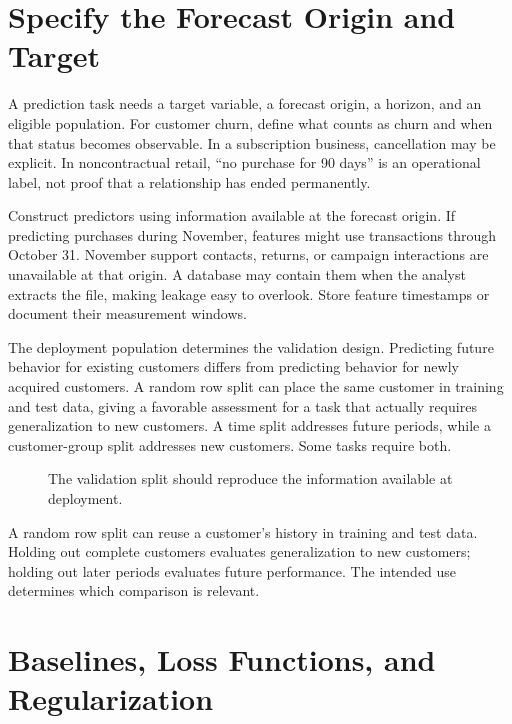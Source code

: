 \hypertarget{M07-specify-the-forecast-origin-and-target}{%
\section{Specify the Forecast Origin and
Target}\label{M07-specify-the-forecast-origin-and-target}}

\noindent A prediction task needs a target variable, a forecast origin, a horizon,
and an eligible population. For customer churn, define what counts as
churn and when that status becomes observable. In a subscription
business, cancellation may be explicit. In noncontractual retail, ``no
purchase for 90 days'' is an operational label, not proof that a
relationship has ended permanently.

Construct predictors using information available at the forecast origin.
If predicting purchases during November, features might use transactions
through October 31. November support contacts, returns, or campaign
interactions are unavailable at that origin. A database may contain them
when the analyst extracts the file, making leakage easy to overlook.
Store feature timestamps or document their measurement windows.

The deployment population determines the validation design. Predicting
future behavior for existing customers differs from predicting behavior
for newly acquired customers. A random row split can place the same
customer in training and test data, giving a favorable assessment for a
task that actually requires generalization to new customers. A time
split addresses future periods, while a customer-group split addresses
new customers. Some tasks require both.

\begin{figure}[htbp]
\centering

\caption{The validation split should reproduce the information available at deployment.}\label{fig:M07_splits}
\end{figure}

A random row split can reuse a customer's history in training and test
data. Holding out complete customers evaluates generalization to new
customers; holding out later periods evaluates future performance. The
intended use determines which comparison is relevant.

\hypertarget{M07-baselines-loss-functions-and-regularization}{%
\section{Baselines, Loss Functions, and
Regularization}\label{M07-baselines-loss-functions-and-regularization}}

